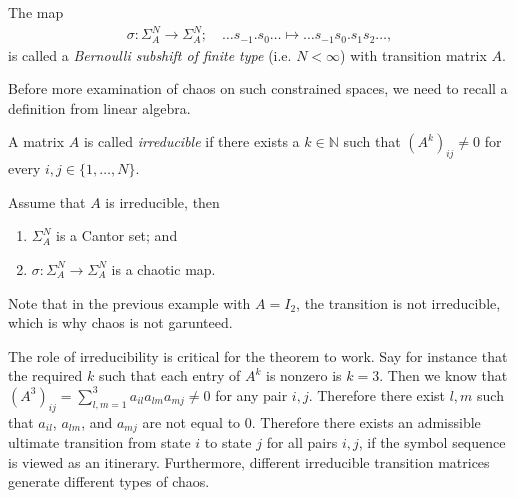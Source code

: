 \begin{definition}
	The map
	\begin{align}
		\sigma:\Sigma_{A}^{N}\to \Sigma_{A}^{N};\quad \ldots s_{-1}\bm{.} s_0 \ldots \mapsto \ldots s_{-1} s_0 \bm{.} s_1 s_2 \ldots,
	\end{align}
	is called a \emph{Bernoulli subshift of finite type} (i.e. $N< \infty $) with transition matrix $A$.
\end{definition}
Before more examination of chaos on such constrained spaces, we need to recall a definition from linear algebra.
\begin{definition}
	A matrix $A$ is called \emph{irreducible} if there exists a $k \in \mathbb{N}$ such that $\left(A^{k}\right)_{ij}\neq 0$ for every $i,j\in \{1,\ldots,N\}$.
\end{definition}

\begin{theorem}[]
	Assume that $A$ is irreducible, then 
	\begin{enumerate}
		\item $\Sigma_{A}^{N}$ is a Cantor set; and
		\item $\sigma:\Sigma_{A}^{N}\to \Sigma_{A}^{N}$ is a chaotic map.
	\end{enumerate}
\end{theorem}

Note that in the previous example with $A=I_{2}$, the transition is not irreducible, which is why chaos is not garunteed.

The role of irreducibility is critical for the theorem to work. Say for instance that the required $k$ such that each entry of $A^{k}$ is nonzero is $k=3$. Then we know that $\left(A^{3}\right)_{ij} = \sum_{l,m=1}^{3} a_{il}a_{lm}a_{mj} \neq 0$ for any pair $i,j$. Therefore there exist $l,m$ such that $a_{il}$, $a_{lm}$, and $a_{mj}$ are not equal to 0. Therefore there exists an admissible ultimate transition from state $i$ to state $j$ for all pairs $i,j$, if the symbol sequence is viewed as an itinerary. Furthermore, different irreducible transition matrices generate different types of chaos. 

